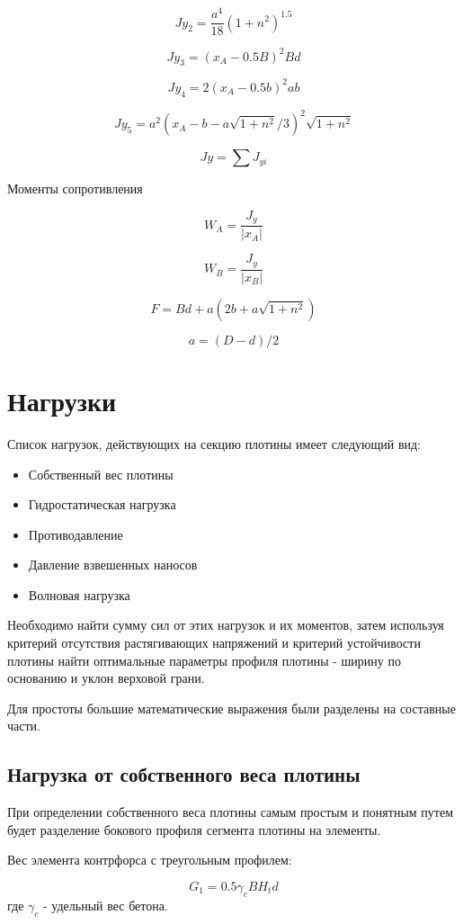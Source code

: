 \documentclass[12pt,a4paper,oneside,draft,titlepage]{article}
\begin{document}
$$ Jy_2 = \frac {a ^ 4}{18} (1 + n ^ 2) ^ {1.5} $$

$$ Jy_3 = (x_A - 0.5  B) ^ 2  B  d $$

$$ Jy_4 = 2  (x_A - 0.5  b) ^ 2  a  b $$

$$ Jy_5 = a ^ 2 (x_A - b - a  \sqrt{1 + n ^ 2} / 3) ^ 2  \sqrt{1 + n ^ 2} $$

$$ Jy = \sum J_{yi} $$

Моменты сопротивления

$$W_A = \frac{J_y}{|x_A|}$$

$$W_B = \frac{J_y}{|x_B|}$$

$$F = B d + a (2  b + a  \sqrt{1 + n ^ 2})$$

$$a = (D - d) / 2 $$

\section{Нагрузки}

Список нагрузок, действующих на секцию плотины имеет следующий вид:

\begin{itemize}
	\item Собственный вес плотины
	\item Гидростатическая нагрузка
	\item Противодавление
	\item Давление взвешенных наносов
	\item Волновая нагрузка
\end{itemize}

Необходимо найти сумму сил от этих нагрузок и их моментов, затем используя критерий отсутствия растягивающих напряжений и критерий устойчивости плотины найти оптимальные параметры профиля плотины - ширину по основанию и уклон верховой грани.

Для простоты большие математические выражения были разделены на составные части.

\subsection{Нагрузка от собственного веса плотины}

При определении собственного веса плотины самым простым и понятным путем будет разделение бокового профиля сегмента плотины на элементы.

Вес элемента контрфорса с треугольным профилем:

$$ G_1 = 0.5  \gamma_c  B  H_t  d $$
где $\gamma_c$ - удельный вес бетона.
\end{document}
